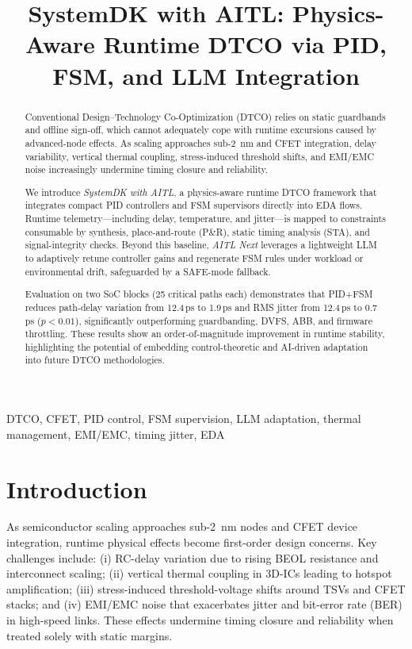 \documentclass[conference]{IEEEtran}
\title{SystemDK with AITL: Physics-Aware Runtime DTCO via PID, FSM, and LLM Integration}
\author{%
  \IEEEauthorblockN{Shinichi Samizo}%
  \IEEEauthorblockA{Independent Semiconductor Researcher\\
  Email: \href{mailto:shin3t72@gmail.com}{shin3t72@gmail.com}}%
}
\begin{document}
\maketitle

\begin{abstract}
Conventional Design--Technology Co-Optimization (DTCO) relies on static guardbands and offline sign-off, which cannot adequately cope with runtime excursions caused by advanced-node effects. As scaling approaches sub-\SI{2}{\nano\meter} and CFET integration, delay variability, vertical thermal coupling, stress-induced threshold shifts, and EMI/EMC noise increasingly undermine timing closure and reliability.

We introduce \emph{SystemDK with AITL}, a physics-aware runtime DTCO framework that integrates compact PID controllers and FSM supervisors directly into EDA flows. Runtime telemetry---including delay, temperature, and jitter---is mapped to constraints consumable by synthesis, place-and-route (P\&R), static timing analysis (STA), and signal-integrity checks. Beyond this baseline, \emph{AITL Next} leverages a lightweight LLM to adaptively retune controller gains and regenerate FSM rules under workload or environmental drift, safeguarded by a SAFE-mode fallback.

Evaluation on two SoC blocks (25 critical paths each) demonstrates that PID+FSM reduces path-delay variation from 12.4\,ps to 1.9\,ps and RMS jitter from 12.4\,ps to 0.7\,ps ($p<0.01$), significantly outperforming guardbanding, DVFS, ABB, and firmware throttling. These results show an order-of-magnitude improvement in runtime stability, highlighting the potential of embedding control-theoretic and AI-driven adaptation into future DTCO methodologies.
\end{abstract}

\begin{IEEEkeywords}
DTCO, CFET, PID control, FSM supervision, LLM adaptation, thermal management, EMI/EMC, timing jitter, EDA
\end{IEEEkeywords}

\section{Introduction}
As semiconductor scaling approaches sub-\SI{2}{\nano\meter} nodes and CFET device integration, runtime physical effects become first-order design concerns. Key challenges include: (i) RC-delay variation due to rising BEOL resistance and interconnect scaling; (ii) vertical thermal coupling in 3D-ICs leading to hotspot amplification; (iii) stress-induced threshold-voltage shifts around TSVs and CFET stacks; and (iv) EMI/EMC noise that exacerbates jitter and bit-error rate (BER) in high-speed links. These effects undermine timing closure and reliability when treated solely with static margins.
\end{document}
